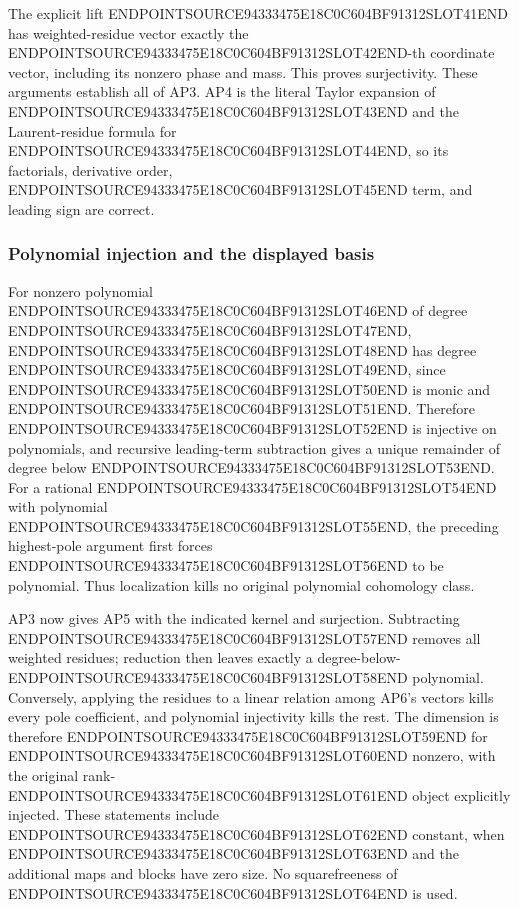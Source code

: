 The explicit lift ENDPOINTSOURCE94333475E18C0C604BF91312SLOT41END has weighted-residue vector exactly the ENDPOINTSOURCE94333475E18C0C604BF91312SLOT42END-th coordinate vector, including its nonzero phase and mass. This proves surjectivity. These arguments establish all of AP3. AP4 is the literal Taylor expansion of ENDPOINTSOURCE94333475E18C0C604BF91312SLOT43END and the Laurent-residue formula for ENDPOINTSOURCE94333475E18C0C604BF91312SLOT44END, so its factorials, derivative order, ENDPOINTSOURCE94333475E18C0C604BF91312SLOT45END term, and leading sign are correct.

\subsubsection{Polynomial injection and the displayed basis}\label{endpoint-analytic_pole_review--polynomial-injection-and-the-displayed-basis}

For nonzero polynomial ENDPOINTSOURCE94333475E18C0C604BF91312SLOT46END of degree ENDPOINTSOURCE94333475E18C0C604BF91312SLOT47END, ENDPOINTSOURCE94333475E18C0C604BF91312SLOT48END has degree ENDPOINTSOURCE94333475E18C0C604BF91312SLOT49END, since ENDPOINTSOURCE94333475E18C0C604BF91312SLOT50END is monic and ENDPOINTSOURCE94333475E18C0C604BF91312SLOT51END. Therefore ENDPOINTSOURCE94333475E18C0C604BF91312SLOT52END is injective on polynomials, and recursive leading-term subtraction gives a unique remainder of degree below ENDPOINTSOURCE94333475E18C0C604BF91312SLOT53END. For a rational ENDPOINTSOURCE94333475E18C0C604BF91312SLOT54END with polynomial ENDPOINTSOURCE94333475E18C0C604BF91312SLOT55END, the preceding highest-pole argument first forces ENDPOINTSOURCE94333475E18C0C604BF91312SLOT56END to be polynomial. Thus localization kills no original polynomial cohomology class.

AP3 now gives AP5 with the indicated kernel and surjection. Subtracting ENDPOINTSOURCE94333475E18C0C604BF91312SLOT57END removes all weighted residues; reduction then leaves exactly a degree-below-ENDPOINTSOURCE94333475E18C0C604BF91312SLOT58END polynomial. Conversely, applying the residues to a linear relation among AP6's vectors kills every pole coefficient, and polynomial injectivity kills the rest. The dimension is therefore ENDPOINTSOURCE94333475E18C0C604BF91312SLOT59END for ENDPOINTSOURCE94333475E18C0C604BF91312SLOT60END nonzero, with the original rank-ENDPOINTSOURCE94333475E18C0C604BF91312SLOT61END object explicitly injected. These statements include ENDPOINTSOURCE94333475E18C0C604BF91312SLOT62END constant, when ENDPOINTSOURCE94333475E18C0C604BF91312SLOT63END and the additional maps and blocks have zero size. No squarefreeness of ENDPOINTSOURCE94333475E18C0C604BF91312SLOT64END is used.

